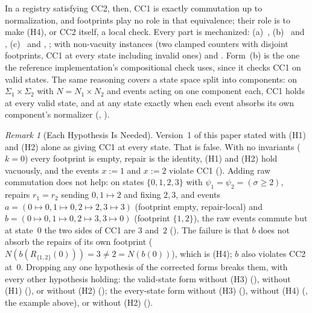 \documentclass[11pt,a4paper]{article}
\theoremstyle{plain}
\theoremstyle{definition}
\theoremstyle{remark}
\newtheorem{remark}[theorem]{Remark}
\begin{document}
In a registry satisfying CC2, then, CC1 is exactly commutation up to
normalization, and footprints play no role in that equivalence; their role is
to make (H4), or CC2 itself, a local check.  Every part is mechanized:
(a)~, (b)~
and , (c)~ and
, 
; with non-vacuity instances
 (two clamped counters with disjoint footprints, CC1
at every state including invalid ones) and .  Form~(b) is
the one the reference implementation's compositional check uses, since it
checks CC1 on valid states.  The same reasoning covers a state space split
into components: on $\Sigma_1 \times \Sigma_2$ with $N = N_1 \times N_2$ and
events acting on one component each, CC1 holds at every valid state, and at
any state exactly when each event absorbs its own component's normalizer
(, ).

\begin{remark}[Each Hypothesis Is Needed]
\label{rem:footprint-counterexamples}
Version~1 of this paper stated  with (H1) and (H2)
alone as giving CC1 at every state.  That is false.  With no invariants
($k = 0$) every footprint is empty, repair is the identity, (H1) and (H2) hold
vacuously, and the events $x := 1$ and $x := 2$ violate CC1
().  Adding raw commutation does not
help: on states $\{0,1,2,3\}$ with $\psi_1 = \psi_2 = (\sigma \geq 2)$,
repairs $r_1 = r_2$ sending $0, 1 \mapsto 2$ and fixing $2, 3$, and events
$a = (0 \mapsto 0, 1 \mapsto 0, 2 \mapsto 2, 3 \mapsto 3)$ (footprint empty,
repair-local) and $b = (0 \mapsto 0, 1 \mapsto 0, 2 \mapsto 3, 3 \mapsto 0)$
(footprint $\{1, 2\}$), the raw events commute but at state~$0$ the two sides
of CC1 are $3$ and~$2$ ().  The
failure is that $b$ does not absorb the repairs of its own footprint
($N(b(R_{\{1,2\}}(0))) = 3 \neq 2 = N(b(0))$), which is (H4); $b$ also
violates CC2 at~$0$.  Dropping any one hypothesis of the corrected forms
breaks them, with every other hypothesis holding: the valid-state form
without (H3) (), without (H1)
(), or without (H2)
(); the every-state form without (H3)
(), without (H4)
(, the example above), or without (H2)
().
\end{remark}
\end{document}
